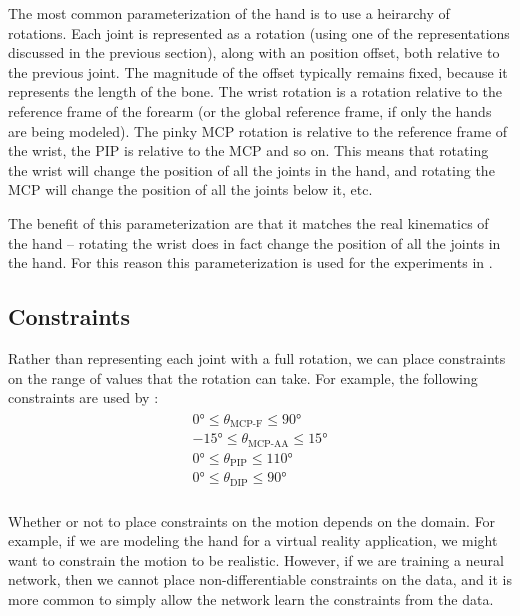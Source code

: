 The most common parameterization of the hand is to use a heirarchy of rotations. Each joint is represented as a rotation (using one of the representations discussed in the previous section), along with an position offset, both relative to the previous joint. The magnitude of the offset typically remains fixed, because it represents the length of the bone. The wrist rotation is a rotation relative to the reference frame of the forearm (or the global reference frame, if only the hands are being modeled). The pinky MCP rotation is relative to the reference frame of the wrist, the PIP is relative to the MCP and so on. This means that rotating the wrist will change the position of all the joints in the hand, and rotating the MCP will change the position of all the joints below it, etc.

The benefit of this parameterization are that it matches the real kinematics of the hand -- rotating the wrist does in fact change the position of all the joints in the hand. For this reason this parameterization is used for the experiments in .

\subsection{Constraints}

Rather than representing each joint with a full rotation, we can place constraints on the range of values that the rotation can take. For example, the following constraints are used by \cite{hand-constraints}:
\begin{align}
\label{eqn:constraints}
\begin{aligned}
    0° ≤ \theta_{\text{MCP-F}} ≤ 90° \\
    -15° ≤ \theta_{\text{MCP-AA}} ≤ 15° \\
    0° ≤ \theta_{\text{PIP}} ≤ 110° \\
    0° ≤ \theta_{\text{DIP}} ≤ 90° \\
\end{aligned}
\end{align}

Whether or not to place constraints on the motion depends on the domain. For example, if we are modeling the hand for a virtual reality application, we might want to constrain the motion to be realistic. However, if we are training a neural network, then we cannot place non-differentiable constraints on the data, and it is more common to simply allow the network learn the constraints from the data.

